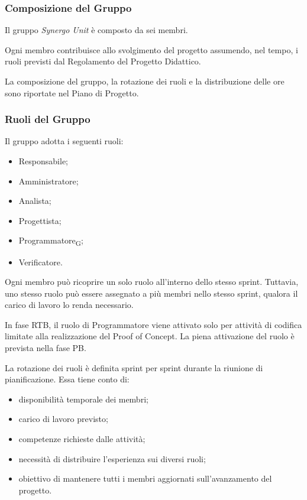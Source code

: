 
\subsubsection{Composizione del Gruppo}

Il gruppo \textit{Synergo Unit} è composto da sei membri.

Ogni membro contribuisce allo svolgimento del progetto assumendo, nel tempo, i
ruoli previsti dal Regolamento del Progetto Didattico.

La composizione del gruppo, la rotazione dei ruoli e la distribuzione delle ore
sono riportate nel Piano di Progetto.


\subsubsection{Ruoli del Gruppo}
\label{sec:ruoli}

Il gruppo adotta i seguenti ruoli:

\begin{itemize}
    \item Responsabile;
    \item Amministratore;
    \item Analista;
    \item Progettista;
    \item Programmatore\textsubscript{G};
    \item Verificatore.
\end{itemize}

Ogni membro può ricoprire un solo ruolo all'interno dello stesso sprint. Tuttavia,
uno stesso ruolo può essere assegnato a più membri nello stesso sprint, qualora il
carico di lavoro lo renda necessario.

In fase RTB, il ruolo di Programmatore viene attivato solo per
attività di codifica limitate alla realizzazione del Proof of Concept.
La piena attivazione del ruolo è prevista nella fase PB.

La rotazione dei ruoli è definita sprint per sprint durante la riunione di
pianificazione. Essa tiene conto di:

\begin{itemize}
    \item disponibilità temporale dei membri;
    \item carico di lavoro previsto;
    \item competenze richieste dalle attività;
    \item necessità di distribuire l'esperienza sui diversi ruoli;
    \item obiettivo di mantenere tutti i membri aggiornati sull'avanzamento del progetto.
\end{itemize}


